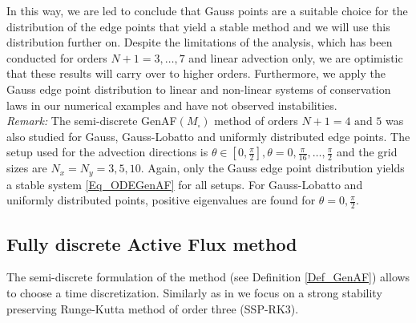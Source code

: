 \documentclass[12pt,a4paper]{article}
\begin{document}
In this way, we are led to conclude that Gauss points are a suitable choice for the distribution of the edge points that yield a stable method and we will use this distribution further on. 
Despite the limitations of the analysis, which has been conducted for orders \(N+1 = 3, \dots, 7\) and linear advection only, we are optimistic that these results will carry over to higher orders. Furthermore, we apply the Gauss edge point distribution to linear and non-linear systems of conservation laws in our numerical examples and have not observed instabilities.\\



\noindent\emph{Remark:} The semi-discrete GenAF$(M_{\square})$ method of orders \(N+1 = 4 \text{ and } 5\) was also studied for Gauss, Gauss-Lobatto and uniformly distributed edge points. The setup used for the advection directions is \(\theta \in [0, \tfrac{\pi}{2}], \theta = 0, \tfrac{\pi}{16}, \dots, \tfrac{\pi}{2}\) and the grid sizes are \(N_x=N_y=3,5,10\).
Again, only the Gauss edge point distribution yields a stable system \eqref{Eq_ODEGenAF} for all setups. For Gauss-Lobatto and uniformly distributed points, positive eigenvalues are found for \(\theta = 0, \tfrac{\pi}{2}\).






\subsection{Fully discrete Active Flux method}

The semi-discrete formulation of the method (see Definition \ref{Def_GenAF}) allows to choose a time discretization. Similarly as in \cite{AB2023FEFV, AB2023ExtensionAF} we focus on a strong stability preserving Runge-Kutta method of order three (SSP-RK3).\\
\end{document}
